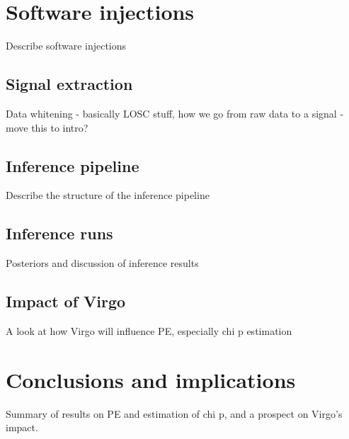 \documentclass[]{article}
\begin{document}
\section{Software injections}
Describe software injections
\subsection{Signal extraction}
Data whitening - basically LOSC stuff, how we go from raw data to a signal - move this to intro?
\subsection{Inference pipeline}
Describe the structure of the inference pipeline
\subsection{Inference runs}
Posteriors and discussion of inference results
\subsection{Impact of Virgo}
A look at how Virgo will influence PE, especially chi p estimation
\section{Conclusions and implications}
Summary of results on PE and estimation of chi p, and a prospect on Virgo's impact.

\end{document}
